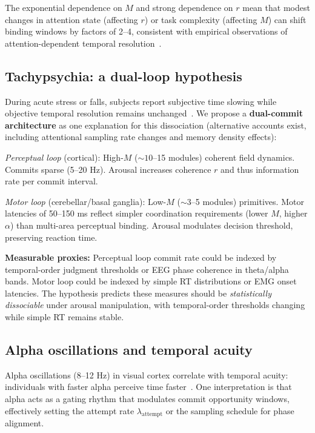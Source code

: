 \documentclass[12pt]{article}
\begin{document}
The exponential dependence on $M$ and strong dependence on $r$ mean that modest changes in attention state (affecting $r$) or task complexity (affecting $M$) can shift binding windows by factors of 2--4, consistent with empirical observations of attention-dependent temporal resolution~\cite{samaha2015}.

\subsection{Tachypsychia: a dual-loop hypothesis}

During acute stress or falls, subjects report subjective time slowing while objective temporal resolution remains unchanged~\cite{stetson2007}. We propose a \textbf{dual-commit architecture} as one explanation for this dissociation (alternative accounts exist, including attentional sampling rate changes and memory density effects):

\emph{Perceptual loop} (cortical): High-$M$ ($\sim 10$--15 modules) coherent field dynamics. Commits sparse (5--20 Hz). Arousal increases coherence $r$ and thus information rate per commit interval.

\emph{Motor loop} (cerebellar/basal ganglia): Low-$M$ ($\sim 3$--5 modules) primitives. Motor latencies of 50--150 ms reflect simpler coordination requirements (lower $M$, higher $\alpha$) than multi-area perceptual binding. Arousal modulates decision threshold, preserving reaction time.

\textbf{Measurable proxies:} Perceptual loop commit rate could be indexed by temporal-order judgment thresholds or EEG phase coherence in theta/alpha bands. Motor loop could be indexed by simple RT distributions or EMG onset latencies. The hypothesis predicts these measures should be \emph{statistically dissociable} under arousal manipulation, with temporal-order thresholds changing while simple RT remains stable.

\subsection{Alpha oscillations and temporal acuity}

Alpha oscillations (8--12 Hz) in visual cortex correlate with temporal acuity: individuals with faster alpha perceive time faster~\cite{samaha2015,cecere2015}. One interpretation is that alpha acts as a gating rhythm that modulates commit opportunity windows, effectively setting the attempt rate $\lambda_{\mathrm{attempt}}$ or the sampling schedule for phase alignment.
\end{document}
